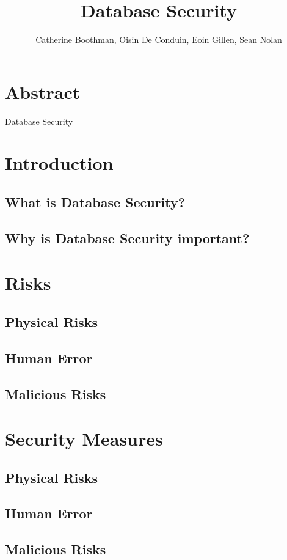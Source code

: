 \documentclass[11pt]{article}
\title{Database Security}
\author{Catherine Boothman, Oisin De Conduin, Eoin Gillen, Sean Nolan}
\begin{document}
\maketitle

\section{Abstract}
Database Security

\section{Introduction}
\subsection{What is Database Security?}
\subsection{Why is Database Security important?}

\section{Risks}

\subsection{Physical Risks}
\subsection{Human Error}
\subsection{Malicious Risks}

\section{Security Measures}
\subsection{Physical Risks}
\subsection{Human Error}
\subsection{Malicious Risks}
\end{document}
